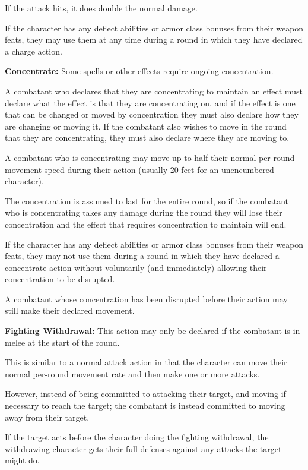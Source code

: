 \begin{multicols*}{2}
If the attack hits, it does double the normal damage.

If the character has any deflect abilities or armor class bonuses from their weapon feats, they may use them at any time during a round in which they have declared a charge action.

\textbf{Concentrate:} Some spells or other effects require ongoing concentration.

A combatant who declares that they are concentrating to maintain an effect must declare what the effect is that they are concentrating on, and if the effect is one that can be changed or moved by concentration they must also declare how they are changing or moving it. If the combatant also wishes to move in the round that they are concentrating, they must also declare where they are moving to.

A combatant who is concentrating may move up to half their normal per-round movement speed during their action (usually 20 feet for an unencumbered character).

The concentration is assumed to last for the entire round, so if the combatant who is concentrating takes any damage during the round they will lose their concentration and the effect that requires concentration to maintain will end.

If the character has any deflect abilities or armor class bonuses from their weapon feats, they may not use them during a round in which they have declared a concentrate action without voluntarily (and immediately) allowing their concentration to be disrupted.

A combatant whose concentration has been disrupted before their action may still make their declared movement.

\textbf{Fighting Withdrawal:} This action may only be declared if the combatant is in melee at the start of the round.

This is similar to a normal attack action in that the character can move their normal per-round movement rate and then make one or more attacks.

However, instead of being committed to attacking their target, and moving if necessary to reach the target; the combatant is instead committed to moving away from their target.

If the target acts before the character doing the fighting withdrawal, the withdrawing character gets their full defenses against any attacks the target might do.


\end{multicols*}
